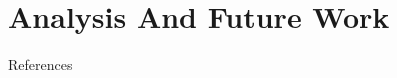\documentclass[aspectratio=169,xcolor=dvipsnames]{beamer}
\begin{document}
\section{Analysis And Future Work}





\begin{frame}{References}
    \footnotesize
    
    
\end{frame}
\end{document}
